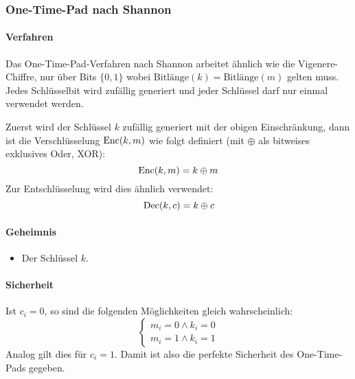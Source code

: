 		\subsubsection{One-Time-Pad nach Shannon}
			\paragraph{Verfahren}
				Das One-Time-Pad-Verfahren nach Shannon arbeitet ähnlich wie die Vigenere-Chiffre, nur über Bits \( \{ 0, 1 \} \) wobei \( \textrm{Bitlänge}(k) = \textrm{Bitlänge}(m) \) gelten muss. Jedes Schlüsselbit wird zufällig generiert und jeder Schlüssel darf nur einmal verwendet werden.

				Zuerst wird der Schlüssel \( k \) zufällig generiert mit der obigen Einschränkung, dann ist die Verschlüsselung \( \operatorname{Enc}(k, m) \) wie folgt definiert (mit \(\oplus\) als bitweises exklusives Oder, XOR):
				\begin{equation*}
					\operatorname{Enc}(k, m) = k \oplus m
				\end{equation*}
				Zur Entschlüsselung wird dies ähnlich verwendet:
				\begin{equation*}
					\operatorname{Dec}(k, c) = k \oplus c
				\end{equation*}

			\paragraph{Geheimnis}
				\begin{itemize}
					\item Der Schlüssel \(k\).
				\end{itemize}

			\paragraph{Sicherheit}
				Ist \( c_i = 0 \), so sind die folgenden Möglichkeiten gleich wahrscheinlich:
				\begin{equation*}
					\begin{cases*}
						m_i = 0 \land k_i = 0 \\
						m_i = 1 \land k_i = 1
					\end{cases*}
				\end{equation*}
				Analog gilt dies für \( c_i = 1 \). Damit ist also die perfekte Sicherheit des One-Time-Pads gegeben.

